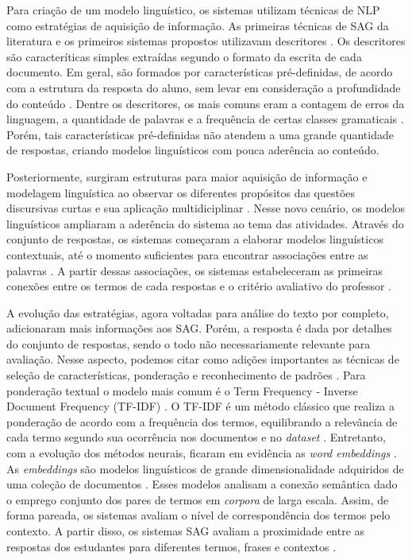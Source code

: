 Para criação de um modelo linguístico, os sistemas utilizam técnicas de NLP como estratégias de aquisição de informação. As primeiras técnicas de SAG da literatura e os primeiros sistemas propostos utilizavam descritores \cite{galhardi2018a}. Os descritores são caracteríticas simples extraídas segundo o formato da escrita de cada documento. Em geral, são formados por características pré-definidas, de acordo com a estrutura da resposta do aluno, sem levar em consideração a profundidade do conteúdo \cite{mohler2009}. Dentre os descritores, os mais comuns eram a contagem de erros da linguagem, a quantidade de palavras e a frequência de certas classes gramaticais \cite{ galhardi2018b, riordan2019}. Porém, tais características pré-definidas não atendem a uma grande quantidade de respostas, criando modelos linguísticos com pouca aderência ao conteúdo.

Posteriormente, surgiram estruturas para maior aquisição de informação e modelagem linguística ao observar os diferentes propósitos das questões discursivas curtas e sua aplicação multidiciplinar \cite{saha2018, kumar2019}. Nesse novo cenário, os modelos linguísticos ampliaram a aderência do sistema ao tema das atividades. Através do conjunto de respostas, os sistemas começaram a elaborar modelos linguísticos contextuais, até o momento suficientes para encontrar associações entre as palavras \cite{tan2020}. A partir dessas associações, os sistemas estabeleceram as primeiras conexões entre os termos de cada respostas e o critério avaliativo do professor \cite{sahu2020}.

A evolução das estratégias, agora voltadas para análise do texto por completo, adicionaram mais informações aos SAG. Porém, a resposta é dada por detalhes do conjunto de respostas, sendo o todo não necessariamente relevante para avaliação. Nesse aspecto, podemos citar como adições importantes as técnicas de seleção de características, ponderação e reconhecimento de padrões \cite{banjade2016}. Para ponderação textual o modelo mais comum é o Term Frequency - Inverse Document Frequency (TF-IDF) \cite{baeza2011}. O TF-IDF é um método clássico que realiza a ponderação de acordo com a frequência dos termos, equilibrando a relevância de cada termo segundo sua ocorrência nos documentos e no \textit{dataset} \cite{sultan2016}. Entretanto, com a evolução dos métodos neurais, ficaram em evidência as \textit{word embeddings} \cite{jurafsky2009}. As \textit{embeddings} são modelos linguísticos de grande dimensionalidade adquiridos de uma coleção de documentos \cite{goldberg2017}. Esses modelos analisam a conexão semântica dado o emprego conjunto dos pares de termos em \textit{corpora} de larga escala. Assim, de forma pareada, os sistemas avaliam o nível de correspondência dos termos pelo contexto. A partir disso, os sistemas SAG avaliam a proximidade entre as respostas dos estudantes para diferentes termos, frases e contextos \cite{sung2019b, ghavidel2020, galhardi2020, haller2022}.

